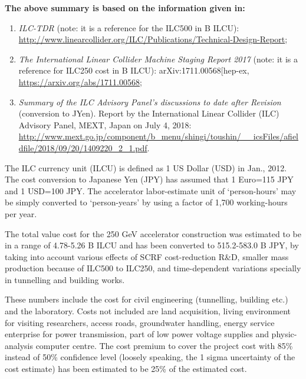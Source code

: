 \documentclass[%
 reprint,
 floatfix,
 amsmath,amssymb,
 aps,
]{revtex4-1}
\begin{document}
\textbf{The above summary is based on the information given in:} 
\begin{enumerate}
\item 
\textit{ILC-TDR} (note: it is a reference for the ILC500 in B ILCU): \url{http://www.linearcollider.org/ILC/Publications/Technical-Design-Report};
\item
\textit{The International Linear Collider Machine Staging Report 2017} (note: it is a reference for ILC250 cost in B ILCU): arXiv:1711.00568[hep-ex, \url{https://arxiv.org/abs/1711.00568};
\item
\textit{Summary of the ILC Advisory Panel's discussions to date after Revision} (conversion to JYen). Report by the International Linear Collider (ILC) Advisory Panel, MEXT, Japan on July 4, 2018: \url{http://www.mext.go.jp/component/b\_menu/shingi/toushin/\_\_icsFiles/afieldfile/2018/09/20/1409220\_2\_1.pdf}.
\end{enumerate}
 
The ILC currency unit (ILCU) is defined as 1 US Dollar (USD) in Jan., 2012. The cost conversion to Japanese Yen (JPY) has assumed that 1 Euro=115 JPY and 1 USD=100 JPY. The accelerator labor-estimate unit of ‘person-hours’ may be simply converted to ‘person-years’ by using a factor of 1,700 working-hours per year.

The total value cost for the 250 GeV accelerator construction was estimated to be in a range of 4.78-5.26 B ILCU and has been converted to 515.2-583.0 B JPY, by taking into account various effects of SCRF cost-reduction R\&D, smaller mass production because of ILC500 to ILC250, and time-dependent variations specially in tunnelling and building works. 

These numbers include the cost for civil engineering (tunnelling, building etc.) and the laboratory. Costs not included are land acquisition, living environment for visiting researchers, access roads, groundwater handling, energy service enterprise for power transmission, part of low power voltage supplies and physic-analysis computer centre. The cost premium to cover the project cost with 85\% instead of 50\% confidence level (loosely speaking, the 1 sigma  uncertainty of the cost estimate) has been estimated to be 25\% of the estimated cost.


\end{document}
